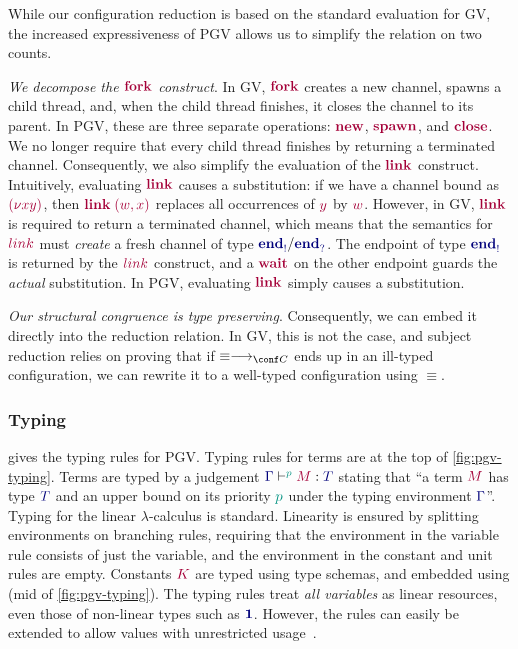 \documentclass[main.tex]{subfiles}
\begin{document}
While our configuration reduction is based on the standard evaluation for GV, the increased expressiveness of PGV allows us to simplify the relation on two counts.
\begin{enumerate*}[label=(\alph*)]
\item
\emph{We decompose the $\tm{\fork}$ construct}.
In GV, $\tm{\fork}$ creates a new channel, spawns a child thread, and, when the child thread finishes, it closes the channel to its parent. In PGV, these are three separate operations: $\tm{\new}$, $\tm{\spawn}$, and $\tm{\close}$. We no longer require that every child thread finishes by returning a terminated channel. Consequently, we also simplify the evaluation of the $\tm{\link}$ construct.
Intuitively, evaluating $\tm{\link}$ causes a substitution: if we have a channel bound as $\tm{\res{x}{y}{}}$, then $\tm{\link\;\pair{w}{x}}$ replaces all occurrences of $\tm{y}$ by $\tm{w}$. However, in GV, $\tm{\link}$ is required to return a terminated channel, which means that the semantics for $\tm{link}$ must \emph{create} a fresh channel of type $\ty{\tyends}/\ty{\tyendr}$. The endpoint of type $\ty{\tyends}$ is returned by the $\tm{link}$ construct, and a $\tm{\wait}$ on the other endpoint guards the \emph{actual} substitution. In PGV, evaluating $\tm{\link}$ simply causes a substitution.
\item
\emph{Our structural congruence is type preserving}. Consequently, we can embed it directly into the reduction relation. In GV, this is not the case, and subject reduction relies on proving that if $\equiv\cred$ ends up in an ill-typed configuration, we can rewrite it to a well-typed configuration using $\equiv$.
\end{enumerate*}


\subsubsection*{Typing}
 gives the typing rules for PGV.
Typing rules for terms are at the top of \cref{fig:pgv-typing}. Terms are typed by a judgement $\tseq[\cs{p}]{\ty{\Gamma}}{M}{T}$ stating that ``a term $\tm{M}$ has type $\ty{T}$ and an upper bound on its priority $\cs{p}$ under the typing environment $\ty{\Gamma}$''. Typing for the linear $\lambda$-calculus is standard. Linearity is ensured by splitting environments on branching rules, requiring that the environment in the variable rule consists of just the variable, and the environment in the constant and unit rules are empty. Constants $\tm{K}$ are typed using type schemas, and embedded using  (mid of \cref{fig:pgv-typing}). The typing rules treat \emph{all variables} as linear resources, even those of non-linear types such as $\ty{\tyunit}$. However, the rules can easily be extended to allow values with unrestricted usage~\cite{wadler14}.
\end{document}
